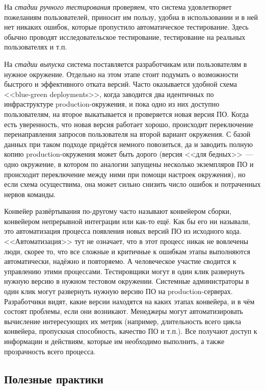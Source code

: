 \documentclass{../../text-style}
\begin{document}
На \emph{стадии ручного тестирования} проверяем, что система удовлетворяет пожеланиям пользователей, приносит им пользу, удобна в использовании и в ней нет никаких ошибок, которые пропустило автоматическое тестирование. Здесь обычно проводят исследовательское тестирование, тестирование на реальных пользователях и т.п.

На \emph{стадии выпуска} система поставляется разработчикам или пользователям в нужное окружение. Отдельно на этом этапе стоит подумать о возможности быстрого и эффективного отката версий. Часто оказывается удобной схема <<blue-green deployments>>, когда заводится два идентичных по инфраструктуре production-окружения, и пока одно из них доступно пользователям, на второе выкатывается и проверяется новая версия ПО. Когда есть уверенность, что новая версия работает хорошо, происходит переключение перенаправления запросов пользователя на второй вариант окружения. С базой данных при таком подходе придётся немного повозиться, да и заводить полную копию production-окружения может быть дорого (версия <<для бедных>>~--- одно окружение, в котором по аналогии запущены несколько экземпляров ПО и происходит переключение между ними при помощи настроек окружения), но если схема осуществима, она может сильно снизить число ошибок и потраченных нервов команды.

Конвейер развёртывания по-другому часто называют конвейером сборки, конвейером непрерывной интеграции или как-то ещё. Как бы его ни называли, это автоматизация процесса появления новых версий ПО из исходного кода. <<Автоматизация>> тут не означает, что в этот процесс никак не вовлечены люди, скорее то, что все сложные и критичные к ошибкам этапы выполняются автоматически, надёжно и повторяемо. А человеческое участие сводится к управлению этими процессами. Тестировщики могут в один клик развернуть нужную версию в нужном тестовом окружении. Системные администраторы в один клик могут развернуть нужную версию ПО на production-серверах. Разработчики видят, какие версии находятся на каких этапах конвейера, и в чём состоят проблемы, если они возникают. Менеджеры могут автоматизировать вычисление интересующих их метрик (например, длительность всего цикла конвейера, пропускная способность, качество ПО и т.п.). Все получают доступ к информации и действиям, которые им необходимо выполнить, а также прозрачность всего процесса.

\subsection{Полезные практики}
\end{document}
